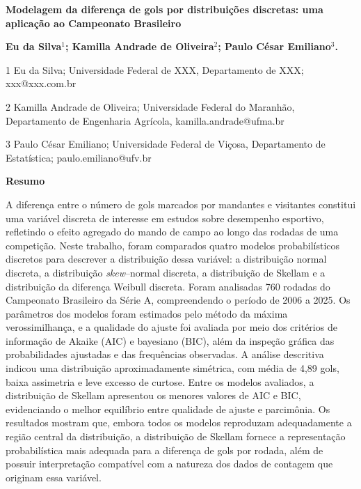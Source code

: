 \documentclass[12pt,a4paper]{article}\usepackage[]{graphicx}\usepackage[]{xcolor}
\begin{document}
\pagestyle{plain} 





\begin{center}
\textbf{\Large Modelagem da diferença de gols por distribuições discretas: uma aplicação ao Campeonato Brasileiro}\\
\end{center} 
\begin{center}
\textbf{Eu da Silva$^{1}$; Kamilla Andrade de Oliveira$^{2}$; Paulo César Emiliano$^{3}$.}
\end{center}

1 Eu da Silva; Universidade Federal de XXX, Departamento de XXX; xxx@xxx.com.br

2 Kamilla Andrade de Oliveira; Universidade Federal do Maranhão, Departamento de Engenharia Agrícola, kamilla.andrade@ufma.br 

3 Paulo César Emiliano; Universidade Federal de Viçosa, Departamento de Estatística; paulo.emiliano@ufv.br


\begin{center}
    \textbf{Resumo}
\end{center}
\vspace{-.3cm}

\noindent 
A diferença entre o número de gols marcados por mandantes e visitantes constitui uma variável discreta de interesse em estudos sobre desempenho esportivo, refletindo o efeito agregado do mando de campo ao longo das rodadas de uma competição. Neste trabalho, foram comparados quatro modelos probabilísticos discretos para descrever a distribuição dessa variável: a distribuição normal discreta, a distribuição \textit{skew}--normal discreta, a distribuição de Skellam e a distribuição da diferença Weibull discreta. Foram analisadas 760 rodadas do Campeonato Brasileiro da Série A, compreendendo o período de 2006 a 2025. Os parâmetros dos modelos foram estimados pelo método da máxima verossimilhança, e a qualidade do ajuste foi avaliada por meio dos critérios de informação de Akaike (AIC) e bayesiano (BIC), além da inspeção gráfica das probabilidades ajustadas e das frequências observadas. A análise descritiva indicou uma distribuição aproximadamente simétrica, com média de 4,89 gols, baixa assimetria e leve excesso de curtose. Entre os modelos avaliados, a distribuição de Skellam apresentou os menores valores de AIC e BIC, evidenciando o melhor equilíbrio entre qualidade de ajuste e parcimônia. Os resultados mostram que, embora todos os modelos reproduzam adequadamente a região central da distribuição, a distribuição de Skellam fornece a representação probabilística mais adequada para a diferença de gols por rodada, além de possuir interpretação compatível com a natureza dos dados de contagem que originam essa variável.
\end{document}
